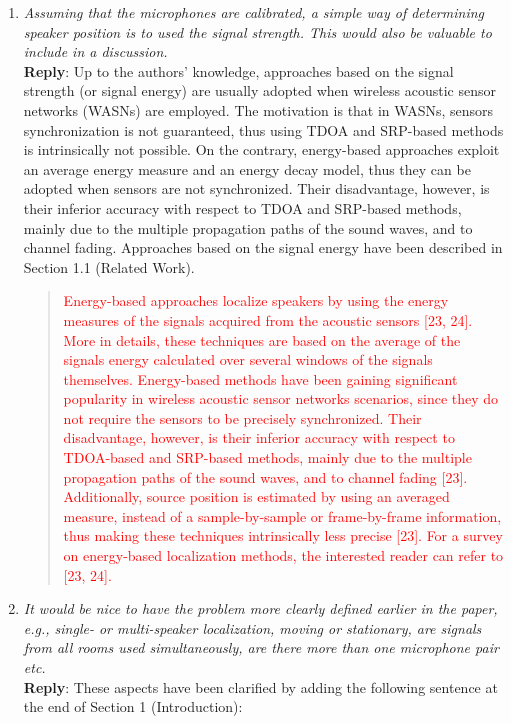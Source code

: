 \documentclass[11pt, technote, letterpaper, oneside, onecolumn]{IEEEtran}
\begin{document}
\begin{enumerate}
\item \textit{Assuming that the microphones are calibrated, a simple way of determining speaker position is to used the signal strength. This would also be valuable to include in a discussion.\\}
\textbf{Reply}: %
Up to the authors' knowledge, approaches based on the signal strength (or signal energy) are usually adopted when wireless acoustic sensor networks (WASNs) are employed. The motivation is that in WASNs, sensors synchronization is not guaranteed, thus using TDOA and SRP-based methods is intrinsically not possible. On the contrary, energy-based approaches exploit an average energy measure and an energy decay model, thus they can be adopted when sensors are not synchronized. Their disadvantage, however, is their inferior accuracy with respect to TDOA and SRP-based methods, mainly due to the multiple propagation paths of the sound waves, and to channel fading. Approaches based on the signal energy have been described in Section 1.1 (Related Work). 

\begin{quote}
\textcolor{red}{
Energy-based approaches localize speakers by using the energy measures of the signals acquired from the acoustic sensors [23, 24]. More in details, these techniques are based on the average of the signals energy calculated over several windows of the signals themselves. Energy-based methods have been gaining significant popularity in wireless acoustic sensor networks scenarios, since they do not require the sensors to be precisely synchronized. Their disadvantage, however, is their inferior accuracy with respect to TDOA-based and SRP-based methods, mainly due to the multiple propagation paths of the sound waves, and to channel fading [23]. Additionally, source position is estimated by using an averaged measure, instead of a sample-by-sample or frame-by-frame information, thus making these techniques intrinsically less precise [23]. For a survey on energy-based localization methods, the interested reader can refer to [23, 24].}
\end{quote}


\item \textit{It would be nice to have the problem more clearly defined earlier in the paper, e.g., single- or multi-speaker localization, moving or stationary, are signals from all rooms used simultaneously, are there more than one microphone pair etc.\\}
\textbf{Reply}: %
 These aspects have been clarified by adding the following sentence at the end of Section 1 (Introduction):


\end{enumerate}
\end{document}
